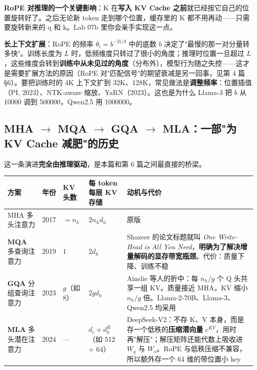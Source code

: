 \textbf{RoPE 对推理的一个关键影响}：K 在\textbf{写入 KV Cache 之前}就已经按它自己的位置旋转好了。之后无论新 token 走到哪个位置，缓存里的 K 都不用再动——只需要旋转新来的 q 和 k。Lab 07b 里你会亲手实现这一点。

\textbf{长上下文扩展}：RoPE 的频率 $\theta_i = b^{-2i/d}$ 中的底数 $b$ 决定了"最慢的那一对分量转多快"。训练长度为 $L$ 时，低频维度只转过了很小的角度；推理时位置一旦超过 $L$，这些维度会转到\textbf{训练中从未见过的角度}（分布外），模型行为随之失控——这才是需要扩展方法的原因（RoPE 对"匹配信号"的期望衰减是另一回事，见第 4 篇 §6）。要把训练时的 4K 上下文扩到 32K、128K，常见做法是\textbf{调整频率}：位置插值（PI, 2023）、NTK-aware 缩放、YaRN（2023）。这也是为什么 Llama-3 把 $b$ 从 10000 调到 500000，Qwen2.5 用 1000000。

\subsection{MHA \texorpdfstring{$\rightarrow$}{->} MQA \texorpdfstring{$\rightarrow$}{->} GQA \texorpdfstring{$\rightarrow$}{->} MLA：一部"为 KV Cache 减肥"的历史}

这一条演进\textbf{完全由推理驱动}，是本篇和第 6 篇之间最直接的桥梁。

\begin{center}
\small
\begin{tabularx}{\textwidth}{l X X X X }
\toprule
\textbf{方案} & \textbf{年份} & \textbf{KV 头数} & \textbf{每 token 每层 KV 存储} & \textbf{动机与代价} \\
\midrule
MHA 多头注意力 & 2017 & $= n_h$ & $2 n_h d_h$ & 原版 \\
\textbf{MQA} 多查询注意力 & 2019 & $1$ & $2 d_h$ & Shazeer 的论文标题就叫 \textit{One Write-Head is All You Need}，\textbf{明确为了解决增量解码的显存带宽瓶颈}。代价：质量下降、训练不稳 \\
\textbf{GQA} 分组查询注意力 & 2023 & $g$（如 8） & $2 g d_h$ & Ainslie 等人的折中：每 $n_h / g$ 个 Q 头共享一组 KV。质量接近 MHA，KV 缩小 $n_h / g$ 倍。Llama-2-70B、Llama-3、Qwen2.5 均采用 \\
\textbf{MLA} 多头潜在注意力 & 2024 & — & $d_c + d_h^R$（如 512 + 64） & DeepSeek-V2：不存 K、V 本身，而是存一个低秩的\textbf{压缩潜向量} $c^{KV}$，用时再"解压"；解压矩阵还能代数上吸收进 $W_q$ 与 $W_o$。RoPE 与低秩压缩不兼容，所以额外存一个 64 维的带位置小 key \\
\bottomrule
\end{tabularx}
\end{center}

